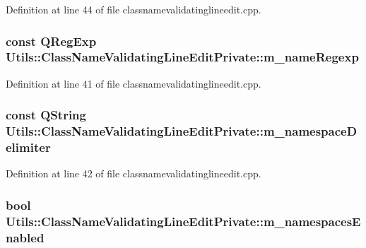 \-Definition at line 44 of file classnamevalidatinglineedit.\-cpp.

\hypertarget{struct_utils_1_1_class_name_validating_line_edit_private_a3b1964b13bc15a3ae11f83e12942fd99}{
\subsubsection[{m\-\_\-name\-Regexp}]{\setlength{\rightskip}{0pt plus 5cm}const \-Q\-Reg\-Exp {\bf \-Utils\-::\-Class\-Name\-Validating\-Line\-Edit\-Private\-::m\-\_\-name\-Regexp}}}\label{struct_utils_1_1_class_name_validating_line_edit_private_a3b1964b13bc15a3ae11f83e12942fd99}


\-Definition at line 41 of file classnamevalidatinglineedit.\-cpp.

\hypertarget{struct_utils_1_1_class_name_validating_line_edit_private_a83c2d2b3c70dd5300a1bc57e518ed3d5}{
\subsubsection[{m\-\_\-namespace\-Delimiter}]{\setlength{\rightskip}{0pt plus 5cm}const {\bf \-Q\-String} {\bf \-Utils\-::\-Class\-Name\-Validating\-Line\-Edit\-Private\-::m\-\_\-namespace\-Delimiter}}}\label{struct_utils_1_1_class_name_validating_line_edit_private_a83c2d2b3c70dd5300a1bc57e518ed3d5}


\-Definition at line 42 of file classnamevalidatinglineedit.\-cpp.

\hypertarget{struct_utils_1_1_class_name_validating_line_edit_private_aac53edaa6749894e449523e8d60c5ec1}{
\subsubsection[{m\-\_\-namespaces\-Enabled}]{\setlength{\rightskip}{0pt plus 5cm}bool {\bf \-Utils\-::\-Class\-Name\-Validating\-Line\-Edit\-Private\-::m\-\_\-namespaces\-Enabled}}}\label{struct_utils_1_1_class_name_validating_line_edit_private_aac53edaa6749894e449523e8d60c5ec1}


